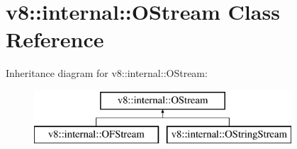 \hypertarget{classv8_1_1internal_1_1_o_stream}{}\section{v8\+:\+:internal\+:\+:O\+Stream Class Reference}
\label{classv8_1_1internal_1_1_o_stream}
Inheritance diagram for v8\+:\+:internal\+:\+:O\+Stream\+:\begin{figure}[H]
\begin{center}
\leavevmode
\includegraphics[height=2.000000cm]{classv8_1_1internal_1_1_o_stream}
\end{center}
\end{figure}
